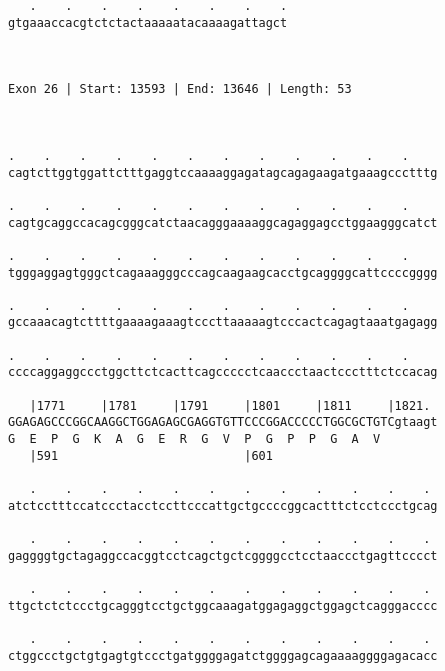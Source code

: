 \documentclass{article}
\begin{document}
\begin{Verbatim}
   .    .    .    .    .    .    .    .
gtgaaaccacgtctctactaaaaatacaaaagattagct
                                       
                                       
 
Exon 26 | Start: 13593 | End: 13646 | Length: 53



.    .    .    .    .    .    .    .    .    .    .    .    
cagtcttggtggattctttgaggtccaaaaggagatagcagagaagatgaaagccctttg
                                                            
.    .    .    .    .    .    .    .    .    .    .    .    
cagtgcaggccacagcgggcatctaacagggaaaaggcagaggagcctggaagggcatct
                                                            
.    .    .    .    .    .    .    .    .    .    .    .    
tgggaggagtgggctcagaaagggcccagcaagaagcacctgcaggggcattccccgggg
                                                            
.    .    .    .    .    .    .    .    .    .    .    .    
gccaaacagtcttttgaaaagaaagtcccttaaaaagtcccactcagagtaaatgagagg
                                                            
.    .    .    .    .    .    .    .    .    .    .    .    
ccccaggaggccctggcttctcacttcagccccctcaaccctaactccctttctccacag
                                                            
   |1771     |1781     |1791     |1801     |1811     |1821. 
GGAGAGCCCGGCAAGGCTGGAGAGCGAGGTGTTCCCGGACCCCCTGGCGCTGTCgtaagt
G  E  P  G  K  A  G  E  R  G  V  P  G  P  P  G  A  V        
   |591                          |601                       
  
   .    .    .    .    .    .    .    .    .    .    .    . 
atctcctttccatccctacctccttcccattgctgccccggcactttctcctccctgcag
                                                            
   .    .    .    .    .    .    .    .    .    .    .    . 
gaggggtgctagaggccacggtcctcagctgctcggggcctcctaaccctgagttcccct
                                                            
   .    .    .    .    .    .    .    .    .    .    .    . 
ttgctctctccctgcagggtcctgctggcaaagatggagaggctggagctcagggacccc
                                                            
   .    .    .    .    .    .    .    .    .    .    .    . 
ctggccctgctgtgagtgtccctgatggggagatctggggagcagaaaaggggagacacc
                                                            

\end{Verbatim}
\end{document}
